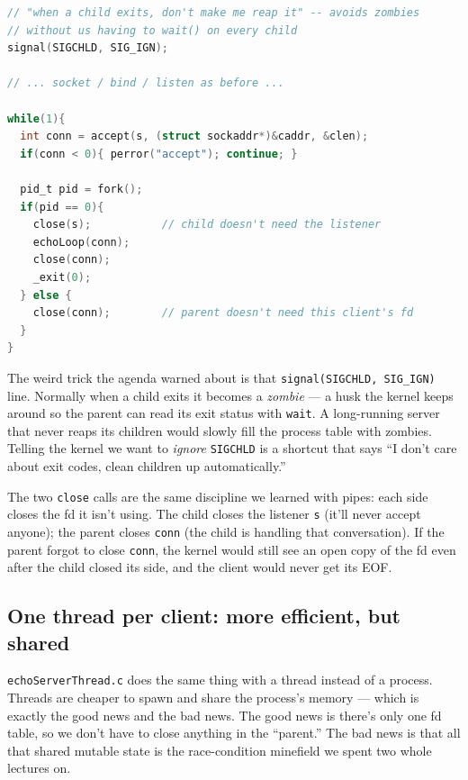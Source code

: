 \documentclass[11pt]{article}
\begin{document}
\begin{lstlisting}[language=C]
// "when a child exits, don't make me reap it" -- avoids zombies
// without us having to wait() on every child
signal(SIGCHLD, SIG_IGN);

// ... socket / bind / listen as before ...

while(1){
  int conn = accept(s, (struct sockaddr*)&caddr, &clen);
  if(conn < 0){ perror("accept"); continue; }

  pid_t pid = fork();
  if(pid == 0){
    close(s);           // child doesn't need the listener
    echoLoop(conn);
    close(conn);
    _exit(0);
  } else {
    close(conn);        // parent doesn't need this client's fd
  }
}
\end{lstlisting}

The weird trick the agenda warned about is that
\texttt{signal(SIGCHLD, SIG\_IGN)} line. Normally when a child exits
it becomes a \emph{zombie} --- a husk the kernel keeps around so the
parent can read its exit status with \texttt{wait}. A long-running
server that never reaps its children would slowly fill the process
table with zombies. Telling the kernel we want to \emph{ignore}
\texttt{SIGCHLD} is a shortcut that says ``I don't care about exit
codes, clean children up automatically.''

The two \texttt{close} calls are the same discipline we learned with
pipes: each side closes the fd it isn't using. The child closes the
listener \texttt{s} (it'll never accept anyone); the parent closes
\texttt{conn} (the child is handling that conversation). If the
parent forgot to close \texttt{conn}, the kernel would still see an
open copy of the fd even after the child closed its side, and the
client would never get its EOF.

\subsection*{One thread per client: more efficient, but shared}

\texttt{echoServerThread.c} does the same thing with a thread
instead of a process. Threads are cheaper to spawn and share the
process's memory --- which is exactly the good news and the bad
news. The good news is there's only one fd table, so we don't have
to close anything in the ``parent.'' The bad news is that all that
shared mutable state is the race-condition minefield we spent two
whole lectures on.
\end{document}
